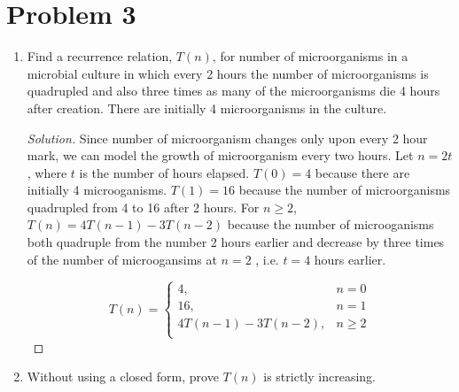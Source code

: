 \documentclass[11pt]{article}
\theoremstyle{plain}%
\theoremstyle{definition}
\theoremstyle{remark}
\newenvironment{solution}
  {\begin{proof}[Solution]}
  {\end{proof}}
\begin{document}
\section*{Problem 3}
\begin{enumerate}
  \item Find a recurrence relation, $T(n)$, for number of microorganisms in a microbial culture in which every 2 hours the number of microorganisms is quadrupled and also three times as many of the microorganisms die 4 hours after creation.  There are initially 4 microorganisms in the culture.

  \begin{solution}
    Since number of microorganism changes only upon every 2 hour mark, we can model the growth of microorganism every two hours. Let $n = 2t$, where $t$ is the number of hours elapsed. $T(0) = 4$ because there are initially 4 microoganisms. $T(1)=16$ because the number of microorganisms quadrupled from 4 to 16 after 2 hours. For $n\geq 2$,  $T(n)= 4T(n-1) - 3T(n-2)$ because the number of microoganisms both quadruple from the number 2 hours earlier and decrease by three times of the number of microogansims at $n=2$ , i.e. $t=4$ hours earlier.

    \begin{equation*}
      T(n) =
      \begin{cases}
        4, & n=0\\
        16, & n=1\\
        4T(n-1) - 3T(n-2), & n\geq 2\\
      \end{cases}
    \end{equation*}
  \end{solution}

  \item Without using a closed form, prove $T(n)$ is strictly increasing.


\end{enumerate}
\end{document}
